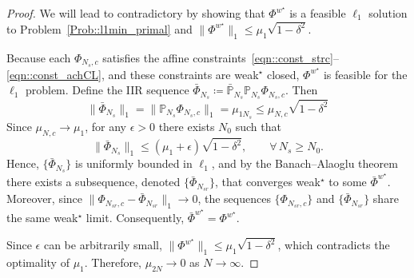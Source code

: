 \begin{proof}
We will lead to contradictory by showing that \(\Phi^{w^\star}\) is a feasible \(\ell_1\) solution to Problem~\ref{Prob::l1min_primal} and \(\|\Phi^{w^\star}\|_1 \leq \mu_1 \sqrt{1 -\delta^2}\).

Because each $\Phi_{N_s,c}$ satisfies the affine constraints~\eqref{eqn::const_strc}--\eqref{eqn::const_achCL}, and these constraints are weak$^\star$ closed, $\Phi^{w^\star}$ is feasible for the $\ell_1$ problem.
Define the IIR sequence $\bar{\Phi}_{N_s} \coloneqq \bar{\mathbb{P}}_{N_s}\mathbb{P}_{N_s}\Phi_{N_s,c}$. Then
\[
\|\bar{\Phi}_{N_s}\|_1 = \|\mathbb{P}_{N_s}\Phi_{N_s,c}\|_1 =\mu_{1 N_s} \le \mu_{N,c} \sqrt{1 -\delta^2}
\]
Since $\mu_{N,c}\to\mu_1$, for any $\epsilon>0$ there exists $N_0$ such that
\[
\|\bar{\Phi}_{N_s}\|_1 \le (\mu_1+\epsilon)\sqrt{1-\delta^2}, \qquad \forall\, N_s\ge N_0.
\]
Hence, $\{\bar{\Phi}_{N_s}\}$ is uniformly bounded in $\ell_1$, and by the Banach--Alaoglu theorem there exists a subsequence, denoted $\{\bar{\Phi}_{N_{sr}}\}$, that converges weak$^\star$ to some $\bar{\Phi}^{w^\star}$.
Moreover, since \(\|\Phi_{N_{sr},c}-\bar{\Phi}_{N_{sr}}\|_1 \to 0\), the sequences $\{\Phi_{N_{sr},c}\}$ and $\{\bar{\Phi}_{N_{sr}}\}$ share the same weak$^\star$ limit. Consequently, \(\bar{\Phi}^{w^\star} = \Phi^{w^\star}\).

Since \(\epsilon\) can be arbitrarily small, \(\|\Phi^{w^\star}\|_1 \leq \mu_1 \sqrt{1 -\delta^2}\), which contradicts the optimality of \(\mu_1\). Therefore, $\mu_{2N}\to 0$ as $N\to\infty$.
\end{proof}

